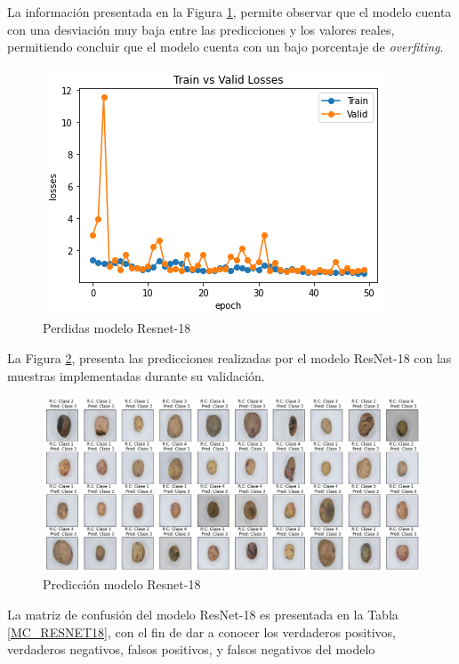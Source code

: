 La información presentada en la Figura \ref{fig:perdda_RESNET18}, permite observar que el modelo cuenta con una desviación muy baja entre las predicciones y los valores reales, permitiendo concluir que el modelo cuenta con un bajo porcentaje de \textit{overfiting}. 

\begin{figure}[ht]
	\centering
	\includegraphics[scale=0.55]{Figs/110.png}
	\caption{Perdidas modelo Resnet-18}
	\label{fig:perdda_RESNET18}
\end{figure}

\newpage
La Figura \ref{fig:pre_RESNET18}, presenta las predicciones realizadas por el modelo ResNet-18 con las muestras implementadas durante su validación.

\begin{figure}[ht]
	\centering
	\includegraphics[scale=0.4]{Figs/111.png}
	\caption{Predicción modelo Resnet-18}
	\label{fig:pre_RESNET18}
\end{figure}

La matriz de confusión del modelo ResNet-18 es presentada en la Tabla \ref*{MC_RESNET18}, con el fin de dar a conocer los verdaderos positivos, verdaderos negativos, falsos positivos, y falsos negativos del modelo


